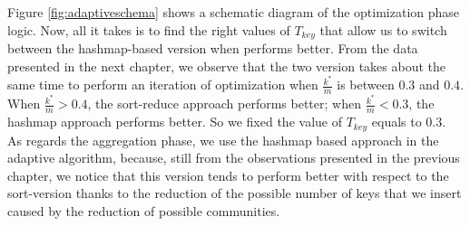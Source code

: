 Figure \ref{fig:adaptiveschema} shows a schematic diagram of the optimization phase logic. Now, all it takes is to find the right values of $T_{key}$ that allow us to switch between the hashmap-based version when performs better. From the data presented in the next chapter, we observe that the two version takes about the same time to perform an iteration of optimization when $\frac{k^*}{m}$ is between $0.3$ and $0.4$. When  $\frac{k^*}{m} > 0.4 $, the sort-reduce approach performs better; when  $\frac{k^*}{m} < 0.3 $, the hashmap approach performs better.
So we fixed the value of $T_{key}$ equals to $0.3$.\\
As regards the aggregation phase, we use the hashmap based approach in the adaptive algorithm, because, still from the observations presented in the previous chapter, we notice that this version tends to perform better with respect to the sort-version thanks to the reduction of the possible number of keys that we insert caused by the reduction of possible communities.
